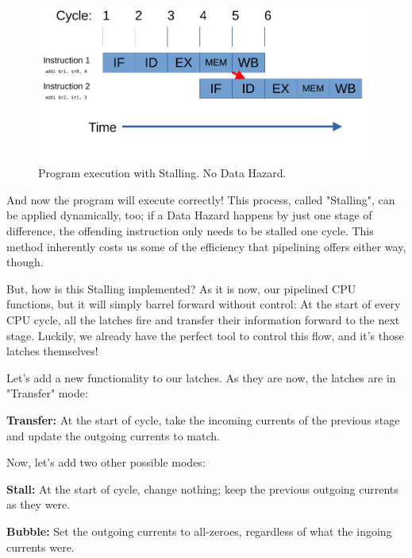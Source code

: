 \documentclass[12pt,twoside]{reedthesis}
\begin{document}
\begin{figure}[h!]

	\centering
	\includegraphics[scale=0.9]{stall}
	\caption{Program execution with Stalling. No Data Hazard.}
	\label{stall}
\end{figure}

And now the program will execute correctly! This process, called "Stalling", can be applied dynamically, too; if a Data Hazard happens by just one stage of difference, the offending instruction only needs to be stalled one cycle. This method inherently costs us some of the efficiency that pipelining offers either way, though.

But, how is this Stalling implemented? As it is now, our pipelined CPU functions, but it will simply barrel forward without control: At the start of every CPU cycle, all the latches fire and transfer their information forward to the next stage. Luckily, we already have the perfect tool to control this flow, and it's those latches themselves!

Let's add a new functionality to our latches. As they are now, the latches are in "Transfer" mode:

\qquad \textbf{Transfer:} At the start of cycle, take the incoming currents of the previous stage and update the outgoing currents to match.

Now, let's add two other possible modes:

\qquad \textbf{Stall:} At the start of cycle, change nothing; keep the previous outgoing currents as they were.

\qquad \textbf{Bubble:} Set the outgoing currents to all-zeroes, regardless of what the ingoing currents were.
\end{document}
